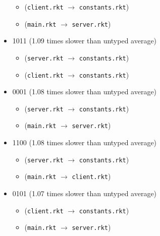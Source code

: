 \documentclass{article}
\newcommand{\mono}[1]{\texttt{#1}}
\begin{document}
\begin{itemize}
  \begin{itemize}
  \item (\mono{client.rkt} $\rightarrow$ \mono{constants.rkt})
  \item (\mono{main.rkt} $\rightarrow$ \mono{server.rkt})
  \end{itemize}
\item 1011 (1.09 times slower than untyped average)
  \begin{itemize}
  \item (\mono{server.rkt} $\rightarrow$ \mono{constants.rkt})
  \item (\mono{client.rkt} $\rightarrow$ \mono{constants.rkt})
  \end{itemize}
\item 0001 (1.08 times slower than untyped average)
  \begin{itemize}
  \item (\mono{server.rkt} $\rightarrow$ \mono{constants.rkt})
  \item (\mono{main.rkt} $\rightarrow$ \mono{server.rkt})
  \end{itemize}
\item 1100 (1.08 times slower than untyped average)
  \begin{itemize}
  \item (\mono{server.rkt} $\rightarrow$ \mono{constants.rkt})
  \item (\mono{main.rkt} $\rightarrow$ \mono{client.rkt})
  \end{itemize}
\item 0101 (1.07 times slower than untyped average)
  \begin{itemize}
  \item (\mono{client.rkt} $\rightarrow$ \mono{constants.rkt})
  \item (\mono{main.rkt} $\rightarrow$ \mono{server.rkt})
  \end{itemize}


\end{itemize}
\end{document}
